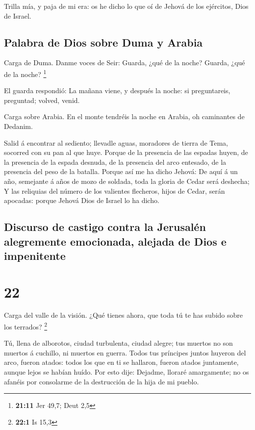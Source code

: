  Trilla mía, y paja de mi era: os he dicho lo que oí de
Jehová de los ejércitos, Dios de Israel.

\hypertarget{palabra-de-dios-sobre-duma-y-arabia}{%
\subsection{Palabra de Dios sobre Duma y
Arabia}\label{palabra-de-dios-sobre-duma-y-arabia}}

 Carga de Duma. Danme voces de Seir: Guarda, ¿qué de la
noche? Guarda, ¿qué de la noche? \footnote{\textbf{21:11} Jer 49,7; Deut
  2,5}

 El guarda respondió: La mañana viene, y después la noche:
si preguntareis, preguntad; volved, venid.

 Carga sobre Arabia. En el monte tendréis la noche en
Arabia, oh caminantes de Dedanim.

 Salid á encontrar al sediento; llevadle aguas, moradores
de tierra de Tema, socorred con su pan al que huye.  Porque
de la presencia de las espadas huyen, de la presencia de la espada
desnuda, de la presencia del arco entesado, de la presencia del peso de
la batalla.  Porque así me ha dicho Jehová: De aquí á un
año, semejante á años de mozo de soldada, toda la gloria de Cedar será
deshecha;  Y las reliquias del número de los valientes
flecheros, hijos de Cedar, serán apocadas: porque Jehová Dios de Israel
lo ha dicho.

\hypertarget{discurso-de-castigo-contra-la-jerusaluxe9n-alegremente-emocionada-alejada-de-dios-e-impenitente}{%
\subsection{Discurso de castigo contra la Jerusalén alegremente
emocionada, alejada de Dios e
impenitente}\label{discurso-de-castigo-contra-la-jerusaluxe9n-alegremente-emocionada-alejada-de-dios-e-impenitente}}

\hypertarget{section-21}{%
\section{22}\label{section-21}}

 Carga del valle de la visión. ¿Qué tienes ahora, que toda
tú te has subido sobre los terrados? \footnote{\textbf{22:1} Is 15,3}

 Tú, llena de alborotos, ciudad turbulenta, ciudad alegre;
tus muertos no son muertos á cuchillo, ni muertos en guerra.
 Todos tus príncipes juntos huyeron del arco, fueron atados:
todos los que en ti se hallaron, fueron atados juntamente, aunque lejos
se habían huído.  Por esto dije: Dejadme, lloraré
amargamente; no os afanéis por consolarme de la destrucción de la hija
de mi pueblo.

